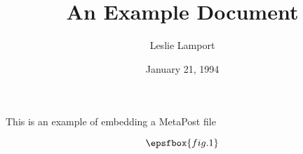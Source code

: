 \documentclass{article}      %
\title{An Example Document}  %
\author{Leslie Lamport}      %
\date{January 21, 1994}      %
\begin{document}

\maketitle                   %

This is an example of embedding a MetaPost file

$$\epsfbox{fig.1}$$
\end{document}
